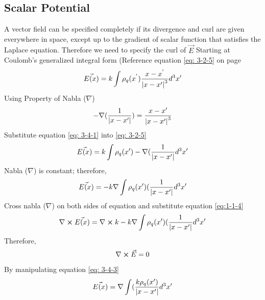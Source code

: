 \documentclass[12pt]{article}
\begin{document}
\subsection{Scalar Potential} \label{section3-4}
    A vector field can be specified completely if its divergence and curl are given everywhere in space, except up to the gradient of scalar function that satisfies the Laplace equation. 
    \newline Therefore we need to specify the curl of $\vec{E}$
    \newline Starting at Coulomb's generalized integral form (Reference equation \ref{eq: 3-2-5} on page \pageref{eq: 3-2-5}
    \begin{gather*}
        \vec{E(x)}= k \int \rho_q(x^{'}) \frac{x-x^{'}}{\abs{x - x'}^3}d^3x'
    \end{gather*}
    \newline Using Property of Nabla ($\nabla$)
    \begin{equation} \label{eq: 3-4-1}
        -\nabla(\frac{1}{\abs{x-x'}}) = \frac{x-x'}{\abs{x - x'}^3}
    \end{equation}
    Substitute equation \ref{eq: 3-4-1} into \ref{eq: 3-2-5}
    \begin{equation} \label{eq: 3-4-2}
        \vec{E(x)}= k \int \rho_q(x') -\nabla(\frac{1}{\abs{x-x'}}d^3x'
    \end{equation}
    Nabla ($\nabla$) is constant; therefore,
    \begin{equation} \label{eq: 3-4-3}
        \vec{E(x)}= -k \nabla \int \rho_q(x') (\frac{1}{\abs{x-x'}}d^3x'
    \end{equation}
    Cross nabla ($\nabla$) on both sides of equation and substitute equation \ref{eq:1-1-4} 
    \begin{equation} \label{eq: 3-4-4}
        \nabla \cross \vec{E(x)}= \nabla \cross k -k\nabla \int \rho_q(x') (\frac{1}{\abs{x-x'}}d^3x'
    \end{equation}
    Therefore,
    \begin{equation} \label{eq: 3-4-5}
        \nabla \cross \vec{E} = 0
    \end{equation}
    By manipulating equation \ref{eq: 3-4-3}
    \begin{equation} \label{eq: 3-4-6}
        \vec{E(x)}= \nabla \int (\frac{k \rho_q (x')}{\abs{x-x'}}d^3x'
    \end{equation}
\end{document}
